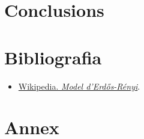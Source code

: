 \documentclass[a4paper]{article}
\begin{document}
	\newpage
	\section{Conclusions}
	
	\newpage
	\section{Bibliografia}
	
	\begin{itemize}
		\item \href{https://ca.wikipedia.org/wiki/Model_d%27Erd%C5%91s-R%C3%A9nyi}{Wikipedia. \textit{Model d'Erdős-Rényi}}.
	\end{itemize}
	
	\newpage
	\section{Annex}
	
	
	
\end{document}
